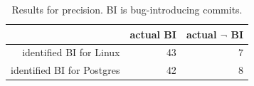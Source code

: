 
\begin{table}
\begin{center}
\begin{tabular}{r|r|r}
& actual BI & actual $\neg$ BI \\ \hline
identified BI for Linux & 43 & 7 \\

identified BI for Postgres & 42 & 8 \\
\end{tabular}
\end{center}
\caption{\label{tab:pr-raw}Results for precision. BI is bug-introducing commits.}


\end{table}


